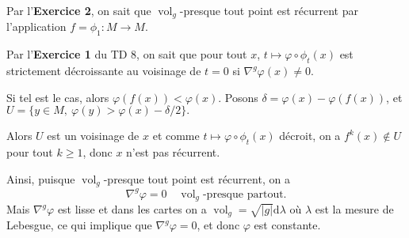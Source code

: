 \documentclass[a4paper,12pt,openany]{article}
\theoremstyle{plain}
\theoremstyle{definition}
\newcommand{\dd}{\mathrm{d}}
\newcommand{\vol}{\operatorname{vol}}
\begin{document}
\begin{enumerate}
Par l'\textbf{Exercice 2}, on sait que $\vol_g$-presque tout point est r\'ecurrent par l'application $f = \phi_1 : M \to M$. 



Par l'\textbf{Exercice 1} du TD 8, on sait que pour tout $x$, $t \mapsto \varphi \circ \phi_{t}(x)$ est strictement d\'ecroissante au voisinage de $t=0$ si $\nabla^{g}\varphi(x) \neq 0$.



Si tel est le cas, alors $\varphi(f(x)) < \varphi(x)$. Posons $\delta = \varphi(x) - \varphi(f(x))$, et $U = \{y \in M,~\varphi(y) > \varphi(x) - \delta / 2\}.$



Alors $U$ est un voisinage de $x$ et comme $t \mapsto \varphi \circ \phi_t(x)$ d\'ecroit, on a $f^k(x) \notin U$ pour tout $k \geqslant 1$, donc $x$ n'est pas r\'ecurrent.



Ainsi, puisque $\vol_g$-presque tout point est r\'ecurrent, on a 
$$
\nabla^g \varphi = 0 \quad \vol_g\text{-presque partout}.
$$
Mais $\nabla^g \varphi$ est lisse et dans les cartes on a $\vol_g = \sqrt{|g|} \dd \lambda$ o\`u $\lambda$ est la mesure de Lebesgue, ce qui implique que $\nabla^g \varphi = 0$, et donc $\varphi$ est constante.
\end{enumerate}
\vspace{0.6cm}
\end{document}
